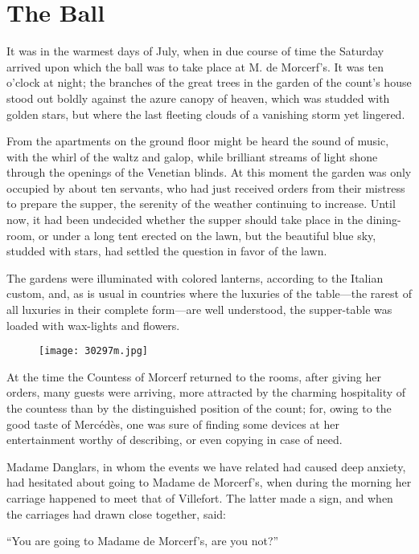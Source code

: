 \chapter{The Ball}

It was in the warmest days of July, when in due course of time the
Saturday arrived upon which the ball was to take place at M. de
Morcerf’s. It was ten o’clock at night; the branches of the great trees
in the garden of the count’s house stood out boldly against the azure
canopy of heaven, which was studded with golden stars, but where the
last fleeting clouds of a vanishing storm yet lingered.

From the apartments on the ground floor might be heard the sound of
music, with the whirl of the waltz and galop, while brilliant streams
of light shone through the openings of the Venetian blinds. At this
moment the garden was only occupied by about ten servants, who had just
received orders from their mistress to prepare the supper, the serenity
of the weather continuing to increase. Until now, it had been undecided
whether the supper should take place in the dining-room, or under a
long tent erected on the lawn, but the beautiful blue sky, studded with
stars, had settled the question in favor of the lawn.

The gardens were illuminated with colored lanterns, according to the
Italian custom, and, as is usual in countries where the luxuries of the
table—the rarest of all luxuries in their complete form—are well
understood, the supper-table was loaded with wax-lights and flowers.

\begin{figure}[ht]
\texttt{[image: 30297m.jpg]}
\end{figure}

At the time the Countess of Morcerf returned to the rooms, after giving
her orders, many guests were arriving, more attracted by the charming
hospitality of the countess than by the distinguished position of the
count; for, owing to the good taste of Mercédès, one was sure of
finding some devices at her entertainment worthy of describing, or even
copying in case of need.

Madame Danglars, in whom the events we have related had caused deep
anxiety, had hesitated about going to Madame de Morcerf’s, when during
the morning her carriage happened to meet that of Villefort. The latter
made a sign, and when the carriages had drawn close together, said:

“You are going to Madame de Morcerf’s, are you not?”

